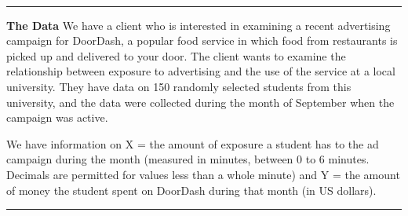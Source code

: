 \documentclass[11pt]{article}
\begin{document}
\begin{titlepage}



\end{titlepage}

\pagebreak

$\:$ \\
\thispagestyle{empty}
\pagebreak

\setcounter{page}{1}

\rule{\textwidth}{0.5pt}

\textbf{The Data} We have a client who is interested in examining a recent advertising campaign for DoorDash, a popular food service in which food from restaurants is picked up and delivered to your door. The client wants to examine the relationship between exposure to advertising and the use of the service at a local university. They have data on 150 randomly selected students from this university, and the data were collected during the month of September when the campaign was active. 

We have information on X = the amount of exposure a student has to the ad campaign  during the month (measured in minutes, between 0 to 6 minutes. Decimals are permitted for values less than a whole minute) and Y = the amount of money the student spent on DoorDash during that month (in US dollars).

\rule{\textwidth}{1pt}
\end{document}
